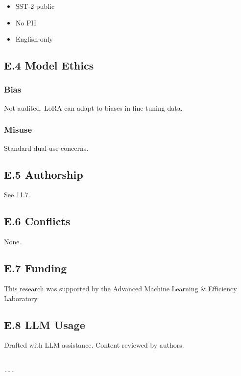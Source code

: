 \begin{itemize}
\item SST-2 public
\item No PII
\item English-only

\end{itemize}
\subsection{E.4 Model Ethics}

\subsubsection{Bias}
Not audited. LoRA can adapt to biases in fine-tuning data.

\subsubsection{Misuse}
Standard dual-use concerns.

\subsection{E.5 Authorship}

See  11.7.

\subsection{E.6 Conflicts}

None.

\subsection{E.7 Funding}

This research was supported by the Advanced Machine Learning \& Efficiency Laboratory.

\subsection{E.8 LLM Usage}

Drafted with LLM assistance. Content reviewed by authors.
\begin{lstlisting}

---
\end{lstlisting}
